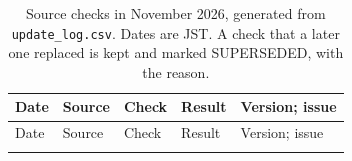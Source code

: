 {\scriptsize
\setlength{\tabcolsep}{3pt}
\begin{longtable}{@{}L{1.25cm} L{2.9cm} L{2.6cm} L{5.0cm} L{4.0cm}@{}}
\caption{Source checks in November 2026, generated from \texttt{update\_log.csv}. Dates are JST. A check that a later one replaced is kept and marked SUPERSEDED, with the reason.}\label{tab:update}\\
\toprule
Date & Source & Check & Result & Version; issue\\\midrule\endfirsthead
\toprule
Date & Source & Check & Result & Version; issue\\\midrule\endhead
\bottomrule\endfoot

\end{longtable}
}
